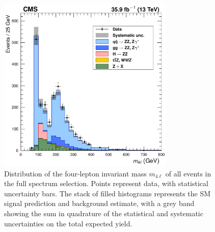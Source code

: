 \begin{figure}[htbp]
  \begin{center}
    \includegraphics[width=0.75\textwidth]{results/zzMass.pdf}
    \caption[Full four-lepton mass spectrum]{
        Distribution of the four-lepton invariant mass $m_{4\ell}$ of all events in the full spectrum selection.
        Points represent data, with statistical uncertainty bars.
        The stack of filled histograms represents the SM signal prediction and background estimate, with a grey band showing the sum in quadrature of the statistical and systematic uncertainties on the total expected yield.
      }\label{fig:mass_full}
  \end{center}
\end{figure}

